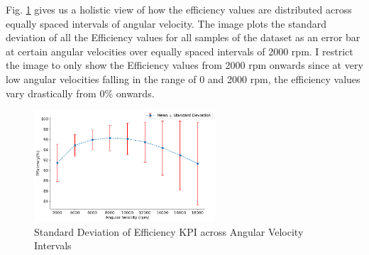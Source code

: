 \documentclass{report} %
\begin{document}
Fig. \ref{fig:Standard Deviation of Efficiency KPI across Angular Velocity Intervals} gives us a holistic view of how the efficiency values are 
distributed across equally spaced intervals of angular velocity. The image plots the standard deviation of all the Efficiency values for all samples of the dataset 
as an error bar at certain angular velocities over equally spaced intervals of 2000 rpm.
I restrict the image to only show the Efficiency values from 2000 rpm onwards since at very low angular velocities falling in the range of 0 and 2000 rpm, the efficiency 
values vary drastically from 0\% onwards.

\begin{figure}[H]
    \centering
    \includegraphics[width=0.6\textwidth]{./ReportImages/stddev_y2_nn_Target.png} 
    \caption{Standard Deviation of Efficiency \ac{KPI} across Angular Velocity Intervals} 
    \label{fig:Standard Deviation of Efficiency KPI across Angular Velocity Intervals}
\end{figure}
\end{document}
